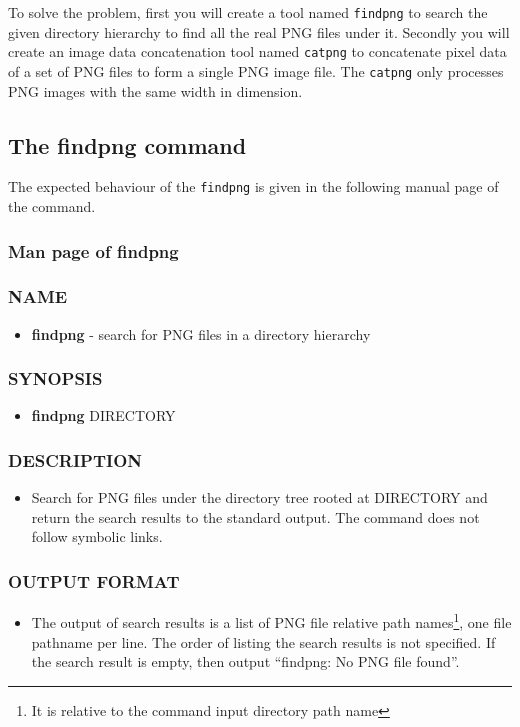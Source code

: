 To solve the problem, first you will create a tool named \verb+findpng+ to search the given directory hierarchy to find all the real PNG files under it. Secondly you will create an image data concatenation tool named \verb+catpng+ to concatenate pixel data of a set of PNG files to form a single PNG image file. The \verb+catpng+ only processes PNG images with the same width in dimension.
\subsection{The findpng command}
The expected behaviour of the \verb+findpng+ is given in the following manual page of the command.
\subsubsection{Man page of findpng}
\subsubsection*{NAME}
\begin{itemize}
	\item[]{\bf findpng} - search for PNG files in a directory hierarchy
\end{itemize}
\subsubsection*{SYNOPSIS}
\begin{itemize}
	\item[]{\bf findpng} DIRECTORY 
\end{itemize}
\subsubsection*{DESCRIPTION}
\begin{itemize}
	\item[]Search for PNG files under the directory tree rooted at DIRECTORY and return the search results to the standard output. The command does not follow symbolic links.
\end{itemize}
\subsubsection*{OUTPUT FORMAT}
\begin{itemize}
	\item[]The output of search results is a list of PNG file relative path names\footnote{It is relative to the command input directory path name}, one file pathname per line. The order of listing the search results is not specified. If the search result is empty, then output ``findpng: No PNG file found''.
\end{itemize}
